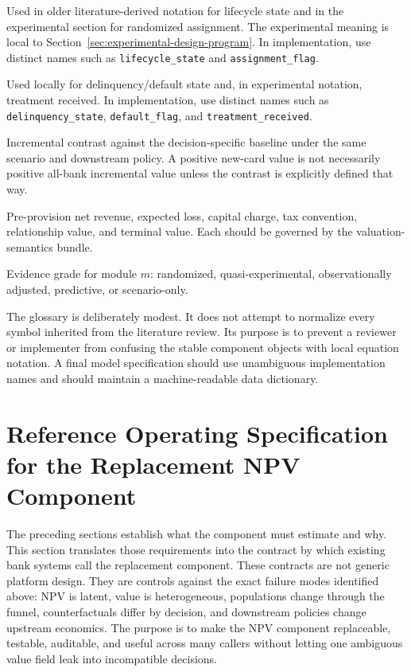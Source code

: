 \documentclass[11pt]{article}
\newcommand{\EL}{\mathrm{EL}}
\newcommand{\PPNR}{\mathrm{PPNR}}
\newcommand{\1}{\mathbf{1}}
\newcommand{\code}[1]{\nolinkurl{#1}}
\begin{document}
\begin{description}[leftmargin=*,style=nextline]
  \item[$Z$]
  Used in older literature-derived notation for lifecycle state and in the
  experimental section for randomized assignment. The experimental meaning is
  local to Section~\ref{sec:experimental-design-program}. In implementation,
  use distinct names such as \code{lifecycle_state} and
  \code{assignment_flag}.

  \item[$D$]
  Used locally for delinquency/default state and, in experimental notation,
  treatment received. In implementation, use distinct names such as
  \code{delinquency_state}, \code{default_flag}, and
  \code{treatment_received}.

  \item[$\Delta$]
  Incremental contrast against the decision-specific baseline under the same
  scenario and downstream policy. A positive new-card value is not necessarily
  positive all-bank incremental value unless the contrast is explicitly defined
  that way.

  \item[$\PPNR$, $\EL$, $Kchg$, $Tax$, $RelValue$, and $TV$]
  Pre-provision net revenue, expected loss, capital charge, tax convention,
  relationship value, and terminal value. Each should be governed by the
  valuation-semantics bundle.

  \item[$G_m$]
  Evidence grade for module $m$: randomized, quasi-experimental,
  observationally adjusted, predictive, or scenario-only.
\end{description}

The glossary is deliberately modest. It does not attempt to normalize every
symbol inherited from the literature review. Its purpose is to prevent a
reviewer or implementer from confusing the stable component objects with local
equation notation. A final model specification should use unambiguous
implementation names and should maintain a machine-readable data dictionary.

\section{Reference Operating Specification for the Replacement NPV Component}
\label{sec:operating-spec}

The preceding sections establish what the component must estimate and why.
This section translates those requirements into the contract by which existing
bank systems call the replacement component. These contracts are not generic
platform design. They are controls against the exact failure modes identified
above: NPV is latent, value is heterogeneous, populations change through the
funnel, counterfactuals differ by decision, and downstream policies change
upstream economics. The purpose is to make the NPV component replaceable,
testable, auditable, and useful across many callers without letting one
ambiguous value field leak into incompatible decisions.
\end{document}
